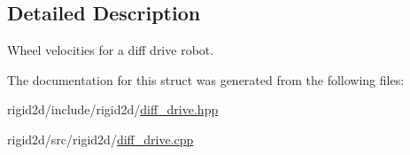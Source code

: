 \subsection{Detailed Description}
Wheel velocities for a diff drive robot. 

The documentation for this struct was generated from the following files\+:\begin{DoxyCompactItemize}
\item 
rigid2d/include/rigid2d/\hyperlink{diff__drive_8hpp}{diff\+\_\+drive.\+hpp}\item 
rigid2d/src/rigid2d/\hyperlink{diff__drive_8cpp}{diff\+\_\+drive.\+cpp}\end{DoxyCompactItemize}
